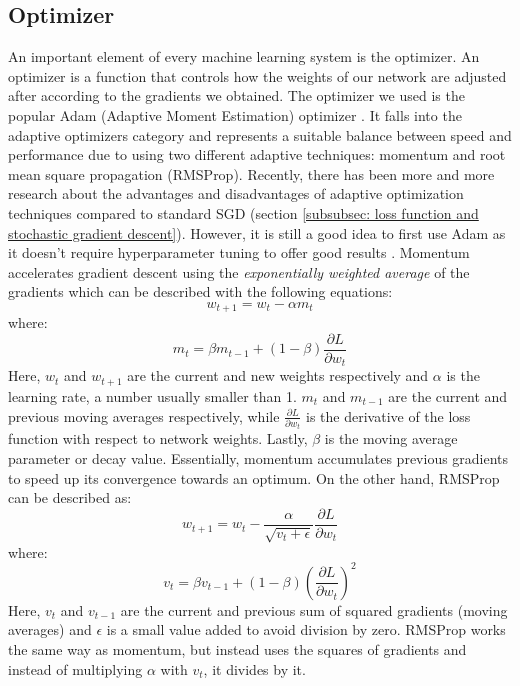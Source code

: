 \documentclass[times, utf8, diplomski, english]{fer_eng}
\begin{document}
\subsection{Optimizer}
\label{subsec:optimizer}

An important element of every machine learning system is the optimizer. An optimizer is a function that controls how the weights of our network are adjusted after according to the gradients we obtained. The optimizer we used is the popular Adam (Adaptive Moment Estimation) optimizer \cite{adam}. It falls into the adaptive optimizers category and represents a suitable balance between speed and performance due to using two different adaptive techniques: momentum and root mean square propagation (RMSProp). Recently, there has been more and more research about the advantages and disadvantages of adaptive optimization techniques compared to standard SGD (section \ref{subsubsec: loss function and stochastic gradient descent}). However, it is still a good idea to first use Adam as it doesn't require hyperparameter tuning to offer good results \cite{optimizers}. Momentum accelerates gradient descent using the \textit{exponentially weighted average} of the gradients which can be described with the following equations:
\[ w_{t+1} = w_t - \alpha m_t \]
where:
\[ m_t = \beta m_{t-1} + (1 - \beta)  \frac{\partial L}{\partial w_t} \]
Here, $w_t$ and $w_{t+1}$ are the current and new weights respectively and $\alpha$ is the learning rate, a number usually smaller than 1. $m_t$ and $m_{t-1}$ are the current and previous moving averages respectively, while $\frac{\partial L}{\partial w_t}$ is the derivative of the loss function with respect to network weights. Lastly, $\beta$ is the moving average parameter or decay value. Essentially, momentum accumulates previous gradients to speed up its convergence towards an optimum. On the other hand, RMSProp can be described as:
\[ w_{t+1} = w_t - \frac{\alpha}{\sqrt{v_t + \epsilon}} \frac{\partial L}{\partial w_t} \]
where:
\[ v_t = \beta v_{t-1} + (1 - \beta) \left(\frac{\partial L}{\partial w_t}\right)^2 \]
Here, $v_t$ and $v_{t-1}$ are the current and previous sum of squared gradients (moving averages) and $\epsilon$ is a small value added to avoid division by zero. RMSProp works the same way as momentum, but instead uses the squares of gradients and instead of multiplying $\alpha$ with $v_t$, it divides by it.
\end{document}
